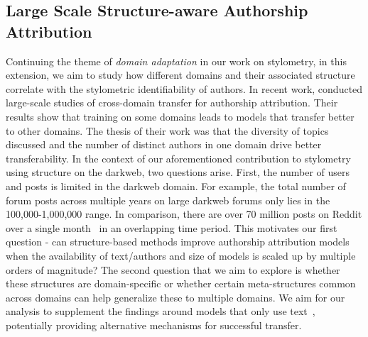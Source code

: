 \subsection{Large Scale Structure-aware Authorship Attribution}
Continuing the theme of \textit{domain adaptation} in our work on stylometry, in this extension, we aim to study how different domains and their associated structure correlate with the stylometric identifiability of authors.
In recent work, \citet{barlas2020cross,riverastao2021learning} conducted large-scale studies of cross-domain transfer for authorship attribution. 
Their results show that training on some domains leads to models that transfer better to other domains.
The thesis of their work was that the diversity of topics discussed and the number of distinct authors in one domain drive better transferability.
In the context of our aforementioned contribution to stylometry using structure on the darkweb, two questions arise.
First, the number of users and posts is limited in the darkweb domain. 
For example, the total number of forum posts across multiple years on large darkweb forums only lies in the 100,000-1,000,000 range.
In comparison, there are over 70 million posts on Reddit over a single month~\citep{andrews2019learning} in an overlapping time period.
This motivates our first question - can structure-based methods improve authorship attribution models when the availability of text/authors and size of models is scaled up by multiple orders of magnitude?
The second question that we aim to explore is whether these structures are domain-specific or whether certain meta-structures common across domains can help generalize these to multiple domains.
We aim for our analysis to supplement the findings around models that only use text~\cite{barlas2020cross,riverastao2021learning}, potentially providing alternative mechanisms for successful transfer.

